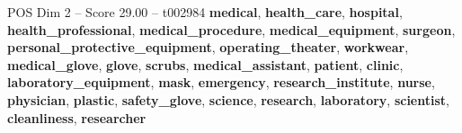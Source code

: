 \begin{textsample}{POS Dim 2 – Score 29.00 – t002984}  \label{ex:f2_pos_024}
\textbf{medical}, \textbf{health\_care}, \textbf{hospital}, \textbf{health\_professional}, \textbf{medical\_procedure}, \textbf{medical\_equipment}, \textbf{surgeon}, \textbf{personal\_protective\_equipment}, \textbf{operating\_theater}, \textbf{workwear}, \textbf{medical\_glove}, \textbf{glove}, \textbf{scrubs}, \textbf{medical\_assistant}, \textbf{patient}, \textbf{clinic}, \textbf{laboratory\_equipment}, \textbf{mask}, \textbf{emergency}, \textbf{research\_institute}, \textbf{nurse}, \textbf{physician}, \textbf{plastic}, \textbf{safety\_glove}, \textbf{science}, \textbf{research}, \textbf{laboratory}, \textbf{scientist}, \textbf{cleanliness}, \textbf{researcher}

\end{textsample}
